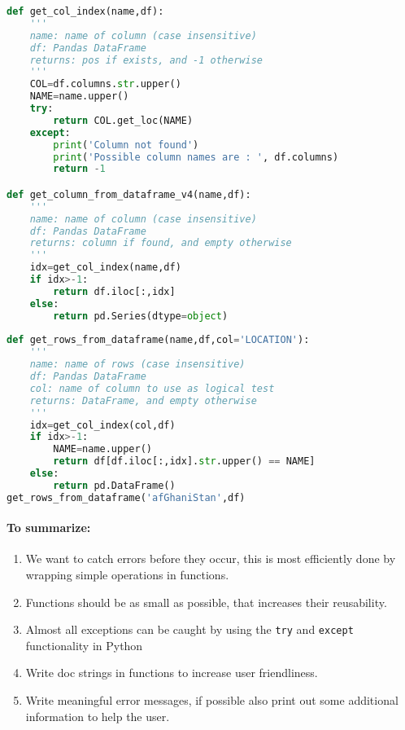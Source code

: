 \documentclass[graybox,sectrefs,envcountresetchap,open=right,final]{svmonodo}
\begin{document}
\begin{lstlisting}[language=python,style=blue1bar]
def get_col_index(name,df):
    '''
    name: name of column (case insensitive)
    df: Pandas DataFrame
    returns: pos if exists, and -1 otherwise 
    '''
    COL=df.columns.str.upper()
    NAME=name.upper()
    try:
        return COL.get_loc(NAME)
    except:
        print('Column not found')
        print('Possible column names are : ', df.columns)
        return -1

def get_column_from_dataframe_v4(name,df):
    '''
    name: name of column (case insensitive)
    df: Pandas DataFrame
    returns: column if found, and empty otherwise 
    '''
    idx=get_col_index(name,df)
    if idx>-1:
        return df.iloc[:,idx]
    else:
        return pd.Series(dtype=object)
        
def get_rows_from_dataframe(name,df,col='LOCATION'):
    '''
    name: name of rows (case insensitive)
    df: Pandas DataFrame
    col: name of column to use as logical test
    returns: DataFrame, and empty otherwise 
    '''
    idx=get_col_index(col,df)
    if idx>-1:
        NAME=name.upper()
        return df[df.iloc[:,idx].str.upper() == NAME]
    else:
        return pd.DataFrame()
get_rows_from_dataframe('afGhaniStan',df)

\end{lstlisting}


\paragraph{To summarize:}

\begin{enumerate}
\item We want to catch errors before they occur, this is most efficiently done by wrapping simple operations in functions.

\item Functions should be as small as possible, that increases their reusability.

\item Almost all exceptions can be caught by using the \texttt{try} and \texttt{except} functionality in Python

\item Write doc strings in functions to increase user friendliness.

\item Write meaningful error messages, if possible also print out some additional information to help the user.
\end{enumerate}
\end{document}
